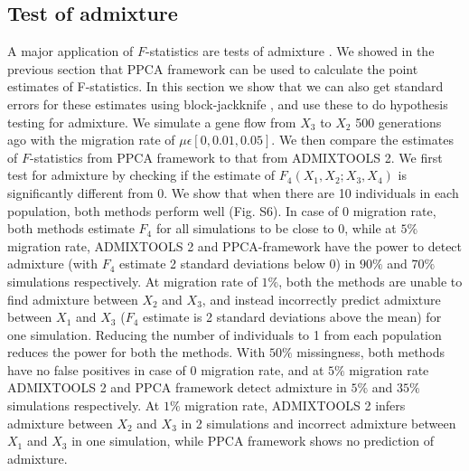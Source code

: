 \documentclass[12pt, letterpaper]{article}
\begin{document}
\subsection{Test of admixture}
A major application of $F$-statistics are tests of admixture \cite{orlando_ancient_2021}. We showed in the previous section that PPCA framework can be used to calculate the point estimates of F-statistics. In this section we show that we can also get standard errors for these estimates using block-jackknife \cite{patterson_modication_nodate}, and use these to do hypothesis testing for admixture. We simulate a gene flow from $X_3$ to $X_2$ 500 generations ago with the migration rate of $\mu \epsilon [0, 0.01, 0.05]$. We then compare the estimates of $F$-statistics from PPCA framework to that from ADMIXTOOLS 2. We first test for admixture by checking if the estimate of $F_4(X_1,X_2;X_3,X_4)$ is significantly different from 0. We show that when there are 10 individuals in each population, both methods perform well (Fig. S6). In case of 0 migration rate, both methods estimate $F_4$ for all simulations to be close to 0, while at $5\%$ migration rate, ADMIXTOOLS 2 and PPCA-framework have the power to detect admixture (with $F_4$ estimate 2 standard deviations below 0) in $90\%$ and $70\%$ simulations respectively. At migration rate of $1\%$, both the methods are unable to find admixture between $X_2$ and $X_3$, and instead incorrectly predict admixture between $X_1$ and $X_3$ ($F_4$ estimate is 2 standard deviations above the mean) for one simulation. Reducing the number of individuals to 1 from each population reduces the power for both the methods. With $50\%$ missingness, both methods have no false positives in case of 0 migration rate, and at $5\%$ migration rate ADMIXTOOLS 2 and PPCA framework detect admixture in $5\%$ and $35\%$ simulations respectively. At $1\%$ migration rate, ADMIXTOOLS 2 infers admixture between $X_2$ and $X_3$ in 2 simulations and incorrect admixture between $X_1$ and $X_3$ in one simulation, while PPCA framework shows no prediction of admixture.
\end{document}

